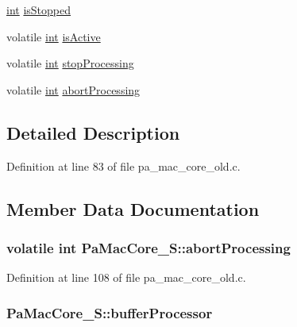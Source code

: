 \begin{DoxyCompactItemize}
\item 
\hyperlink{xmltok_8h_a5a0d4a5641ce434f1d23533f2b2e6653}{int} \hyperlink{struct_pa_mac_core___s_a10e111b013ef34840e71760dbdf5deb7}{is\+Stopped}
\item 
volatile \hyperlink{xmltok_8h_a5a0d4a5641ce434f1d23533f2b2e6653}{int} \hyperlink{struct_pa_mac_core___s_a899bd0773fde0676745ed3aeb3740909}{is\+Active}
\item 
volatile \hyperlink{xmltok_8h_a5a0d4a5641ce434f1d23533f2b2e6653}{int} \hyperlink{struct_pa_mac_core___s_ab18e0e8e4ef7c2746b573ae83c0e5c36}{stop\+Processing}
\item 
volatile \hyperlink{xmltok_8h_a5a0d4a5641ce434f1d23533f2b2e6653}{int} \hyperlink{struct_pa_mac_core___s_abcbe64580dd9da2d15549cc3acd04f49}{abort\+Processing}
\end{DoxyCompactItemize}


\subsection{Detailed Description}


Definition at line 83 of file pa\+\_\+mac\+\_\+core\+\_\+old.\+c.



\subsection{Member Data Documentation}
\subsubsection[{\texorpdfstring{abort\+Processing}{abortProcessing}}]{\setlength{\rightskip}{0pt plus 5cm}volatile {\bf int} Pa\+Mac\+Core\+\_\+\+S\+::abort\+Processing}\hypertarget{struct_pa_mac_core___s_abcbe64580dd9da2d15549cc3acd04f49}{}\label{struct_pa_mac_core___s_abcbe64580dd9da2d15549cc3acd04f49}


Definition at line 108 of file pa\+\_\+mac\+\_\+core\+\_\+old.\+c.

\subsubsection[{\texorpdfstring{buffer\+Processor}{bufferProcessor}}]{ Pa\+Mac\+Core\+\_\+\+S\+::buffer\+Processor}\hypertarget{struct_pa_mac_core___s_a1e00da50807768b8b5e2bbc9aebd647f}{}\label{struct_pa_mac_core___s_a1e00da50807768b8b5e2bbc9aebd647f}


